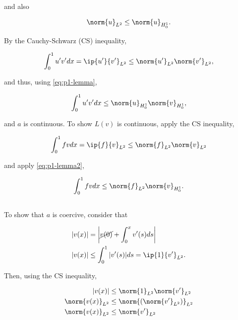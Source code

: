\documentclass{hw-template}
\newcommand{\p}{^\prime}
\newcommand{\hlin}{{H_0^1}}
\newcommand{\ltwo}{{L^2}}
\begin{document}
and also

\begin{equation}
    \norm{u}_{\ltwo} \leq \norm{u}_{\hlin}.\label{eq:p1-lemma2}
\end{equation}

By the Cauchy-Schwarz (CS) inequality, 

\begin{equation}
    \int_0^1 u\p v\p dx = \ip{u\p}{v\p}_{\ltwo} \leq \norm{u\p}_{\ltwo} \norm{v\p}_{\ltwo},
\end{equation}

and thus, using \autoref{eq:p1-lemma}, \

\begin{equation}
    \int_0^1 u\p v\p dx \leq \norm{u}_{\hlin} \norm{v}_{\hlin},
\end{equation}

and $a$ is continuous. To show $L(v)$ is continuous, apply the CS inequality,

\begin{equation}
    \int_0^1 fv dx = \ip{f}{v}_{\ltwo} \leq \norm{f}_\ltwo \norm{v}_\ltwo
\end{equation}

and apply \autoref{eq:p1-lemma2},

\begin{equation}
    \int_0^1 fv dx \leq \norm{f}_\ltwo \norm{v}_\hlin.
\end{equation}


\subsection{}

To show that $a$ is coercive, consider that

\begin{align}
    |v(x)| &= \left|\cancel{v(0)} + \int_0^x v\p (s) ds \right|\\
    |v(x)| &\leq \int_0^1 |v\p (s)| ds = \ip{1}{v\p}_\ltwo.
\end{align}

Then, using the CS inequality,

\begin{align}
    |v(x)| &\leq \norm{1}_\ltwo \norm{v\p}_\ltwo\\
    \norm{v(x)}_\ltwo &\leq \norm{(\norm{v\p}_\ltwo)}_\ltwo\\
    \norm{v(x)}_\ltwo &\leq \norm{v\p}_\ltwo
\end{align}

\subsection{}
\end{document}
